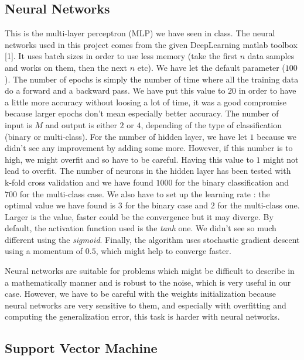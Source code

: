 \documentclass{article} %
\begin{document}
\subsection{Neural Networks}

This is the multi-layer perceptron (MLP) we have seen in class. The neural networks used in this project comes from the given DeepLearning matlab toolbox [1]. It uses batch sizes in order to use less memory (take the first $n$ data samples and works on them, then the next $n$ etc). We have let the default parameter ($100$). The number of epochs is simply the number of time where all the training data do a forward and a backward pass. We have put this value to $20$ in order to have a little more accuracy without loosing a lot of time, it was a good compromise because larger epochs don't mean especially better accuracy. The number of input is $M$ and output is either $2$ or $4$, depending of the type of classification (binary or multi-class). For the number of hidden layer, we have let $1$ because we didn't see any improvement by adding some more. However, if this number is to high, we might overfit and so have to be careful. Having this value to $1$ might not lead to overfit. The number of neurons in the hidden layer has been tested with k-fold cross validation and we have found $1000$ for the binary classification and $700$ for the multi-class case. We also have to set up the learning rate : the optimal value we have found is $3$ for the binary case and $2$ for the multi-class one. Larger is the value, faster could be the convergence but it may diverge. By default, the activation function used is the \textit{tanh} one. We didn't see so much different using the \textit{sigmoid}. Finally, the algorithm uses stochastic gradient descent using a momentum of $0.5$, which might help to converge faster.

Neural networks are suitable for problems which might be difficult to describe in a mathematically manner and is robust to the noise, which is very useful in our case. However, we have to be careful with the weights initialization because neural networks are very sensitive to them, and especially with overfitting and computing the generalization error, this task is harder with neural networks.

\subsection{Support Vector Machine}
\end{document}
